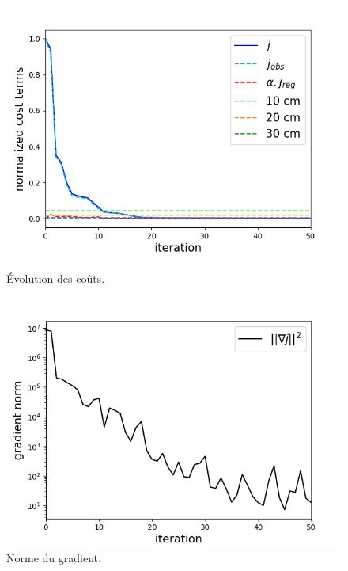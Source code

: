 \documentclass{article}
\begin{document}
\begin{figure}[H]
    \centering
    \begin{minipage}[b]{0.48\linewidth}
        \centering
        \includegraphics[width=\linewidth]{Images_Ayoub/h_connue/Costs.png}
        \caption{Évolution des coûts.}
        \label{fig:hconnue-costs}
    \end{minipage}
    \hfill
    \begin{minipage}[b]{0.48\linewidth}
        \centering
        \includegraphics[width=\linewidth]{Images_Ayoub/h_connue/Gradient.png}
        \caption{Norme du gradient.}
        \label{fig:hconnue-gradient}
    \end{minipage}
    

\end{figure}
\end{document}
